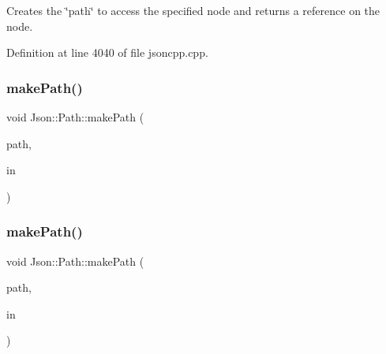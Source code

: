 Creates the \char`\"{}path\char`\"{} to access the specified node and returns a reference on the node. 

Definition at line 4040 of file jsoncpp.\+cpp.

\hypertarget{class_json_1_1_path_a362a420a47acb1a1f9c79173cbfef94d}{}\label{class_json_1_1_path_a362a420a47acb1a1f9c79173cbfef94d} 
\subsubsection{\texorpdfstring{make\+Path()}{makePath()}\hspace{0.1cm}{\footnotesize\ttfamily [1/2]}}
{\footnotesize\ttfamily void Json\+::\+Path\+::make\+Path (\begin{DoxyParamCaption}\item[{const \hyperlink{config_8h_a1e723f95759de062585bc4a8fd3fa4be}{J\+S\+O\+N\+C\+P\+P\+\_\+\+S\+T\+R\+I\+NG} \&}]{path,  }\item[{const \hyperlink{class_json_1_1_path_ab29d7b2fc896c7d3c5ed4609af3a3f23}{In\+Args} \&}]{in }\end{DoxyParamCaption})\hspace{0.3cm}{\ttfamily [private]}}

\hypertarget{class_json_1_1_path_a362a420a47acb1a1f9c79173cbfef94d}{}\label{class_json_1_1_path_a362a420a47acb1a1f9c79173cbfef94d} 
\subsubsection{\texorpdfstring{make\+Path()}{makePath()}\hspace{0.1cm}{\footnotesize\ttfamily [2/2]}}
{\footnotesize\ttfamily void Json\+::\+Path\+::make\+Path (\begin{DoxyParamCaption}\item[{const \hyperlink{config_8h_a1e723f95759de062585bc4a8fd3fa4be}{J\+S\+O\+N\+C\+P\+P\+\_\+\+S\+T\+R\+I\+NG} \&}]{path,  }\item[{const \hyperlink{class_json_1_1_path_ab29d7b2fc896c7d3c5ed4609af3a3f23}{In\+Args} \&}]{in }\end{DoxyParamCaption})\hspace{0.3cm}{\ttfamily [private]}}



